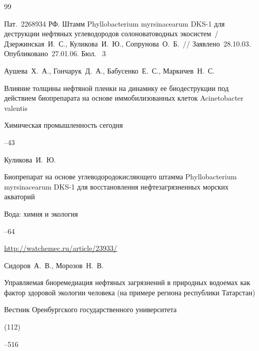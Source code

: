 \begin{thebibliography}{99}

\thesis \rm Пат.~2268934 РФ. Штамм Phyllobacterium myrsinacearum DKS-1 для деструкции нефтяных углеводородов солоноватоводных экосистем~/ Дзержинская~И.~С., Куликова~И.~Ю., Сопрунова~О.~Б.~// Заявлено~28.10.03. Опубликовано~27.01.06. Бюл. \No~3






\by Аушева~Х.~А., Гончарук~Д.~А., Бабусенко~Е.~С., Маркичев~Н.~С.

\paper Влияние толщины нефтяной пленки на динамику ее биодеструкции под действием биопрепарата на основе иммобилизованных клеток Acinetobacter valentis

\jour  Химическая промышленность сегодня



--43





\by Куликова~И.~Ю.

\paper Биопрепарат на основе углеводородокисляющего штамма Phyllo\-bacterium myrsinacearum DKS-1 для восстановления нефтезагрязненных морских акваторий

\jour Вода: химия и экология



--64

\url{http://watchemec.ru/article/23933/}





\by Сидоров~А.~В., Морозов~Н.~В.

\paper  Управляемая биоремедиация нефтяных загрязнений в природных водоемах как фактор здоровой экологии человека (на примере региона республики Татарстан)

\jour Вестник Оренбургского государственного университета


(112)

--516





\end{thebibliography}
